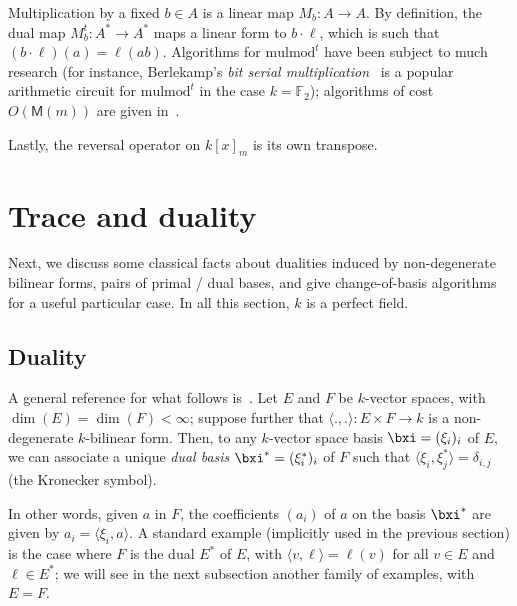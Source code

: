 \documentclass{sig-alternate}
\def\M {\ensuremath{\mathsf{M}}}
\def\F {\ensuremath{\mathbb{F}}}
\def\mulmod {\ensuremath{\mathrm{mulmod}}}
\newcounter{algo}
\newcommand{\ang}[1]{\langle#1\rangle}
\begin{document}
Multiplication by a fixed $b\in A$ is a linear map $M_b:A\to A$. By
definition, the dual map $M_b^t: A^* \to A^*$ maps a linear form to $b
\cdot \ell$, which is such that $(b \cdot \ell)(a)
=\ell(ab)$. Algorithms for $\mulmod^t$ have been subject to much
research (for instance, Berlekamp's \emph{bit serial
  multiplication}~\cite{Berlekamp82} is a popular arithmetic circuit
for $\mulmod^t$ in the case $k=\F_2$); algorithms of cost $O(\M(m))$
are given in~\cite{shoup99,bostan+lecerf+schost:tellegen}. 

Lastly, the reversal operator on $k[x]_m$ is its own transpose.


\section{Trace and duality}\label{sec:trace}

Next, we discuss some classical facts about dualities induced by
non-degenerate bilinear forms, pairs of primal / dual bases, and give
change-of-basis algorithms for a useful particular case. In all this
section, $k$ is a perfect field.


\subsection{Duality}\label{ssec:duality}

A general reference for what follows
is~\cite[Ch.~IX.1.8]{BourbakiAlgCom9}. Let $E$ and $F$ be $k$-vector
spaces, with $\dim(E)=\dim(F) < \infty$; suppose further that
$\ang{.,.}: E\times F \to k$ is a non-degenerate $k$-bilinear form.
Then, to any $k$-vector space basis $\bxi=(\xi_i)_i$ of $E$, we
can associate a unique \emph{dual basis}
$\bxi^\ast=(\xi_i^\ast)_i$ of $F$ such that $
\ang{\xi_i,\xi^\ast_j} = \delta_{i,j}$ (the Kronecker symbol).

In other words, given $a$ in $F$, the coefficients $(a_i)$ of $a$ on
the basis $\bxi^\ast$ are given by $a_i=\ang{\xi_i, a}$. A
standard example (implicitly used in the previous section) is the case
where $F$ is the dual $E^*$ of $E$, with $\ang{v,\ell}=\ell(v)$ for
all $v\in E$ and $\ell \in E^*$; we will see in the next subsection
another family of examples, with $E=F$.
\end{document}
